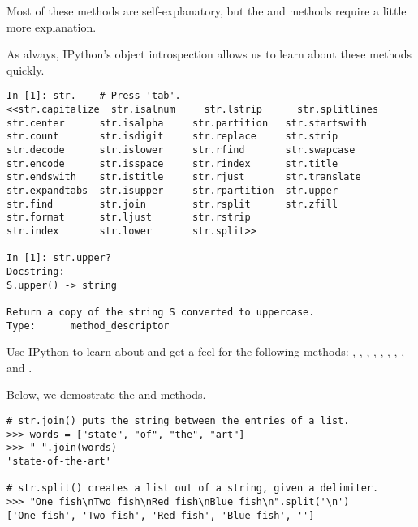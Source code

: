 Most of these methods are self-explanatory, but the  and  methods require a little more explanation.

As always, IPython's object introspection allows us to learn about these methods quickly.
\begin{lstlisting}
In [1]: str.    # Press 'tab'.
<<str.capitalize  str.isalnum     str.lstrip      str.splitlines
str.center      str.isalpha     str.partition   str.startswith
str.count       str.isdigit     str.replace     str.strip
str.decode      str.islower     str.rfind       str.swapcase
str.encode      str.isspace     str.rindex      str.title
str.endswith    str.istitle     str.rjust       str.translate
str.expandtabs  str.isupper     str.rpartition  str.upper
str.find        str.join        str.rsplit      str.zfill
str.format      str.ljust       str.rstrip      
str.index       str.lower       str.split>>

In [1]: str.upper?
Docstring:
S.upper() -> string

Return a copy of the string S converted to uppercase.
Type:      method_descriptor
\end{lstlisting}

Use IPython to learn about and get a feel for the following  methods: , , , , , , , , and .

Below, we demostrate the  and  methods.

\begin{lstlisting}
# str.join() puts the string between the entries of a list.
>>> words = ["state", "of", "the", "art"]
>>> "-".join(words)
'state-of-the-art'

# str.split() creates a list out of a string, given a delimiter.
>>> "One fish\nTwo fish\nRed fish\nBlue fish\n".split('\n')
['One fish', 'Two fish', 'Red fish', 'Blue fish', '']
\end{lstlisting}

